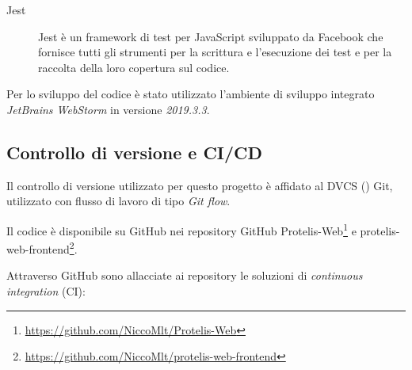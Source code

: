 \begin{description}
        \item[Jest]
          Jest è un framework di test per JavaScript sviluppato da Facebook che fornisce tutti gli strumenti per la scrittura e l'esecuzione dei test e per la raccolta della loro copertura sul codice.
      \end{description}

      Per lo sviluppo del codice è stato utilizzato l'ambiente di sviluppo integrato \emph{JetBrains WebStorm} in versione \emph{2019.3.3}.

  \subsection{Controllo di versione e CI/CD}
    Il controllo di versione utilizzato per questo progetto è affidato al DVCS () Git, utilizzato con flusso di lavoro di tipo \emph{Git flow}.


    Il codice è disponibile su GitHub nei repository GitHub Protelis-Web\footnote{\url{https://github.com/NiccoMlt/Protelis-Web}}
    e protelis-web-frontend\footnote{\url{https://github.com/NiccoMlt/protelis-web-frontend}}.

    Attraverso GitHub sono allacciate ai repository le soluzioni di \emph{continuous integration} (CI):

